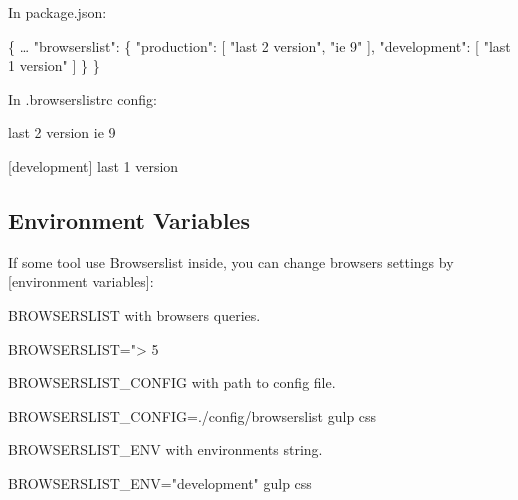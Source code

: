 In {\ttfamily package.\+json}\+:


\begin{DoxyCode}
\{
  …
  "browserslist": \{
    "production": [
      "last 2 version",
      "ie 9"
    ],
    "development": [
      "last 1 version"
    ]
  \}
\}
\end{DoxyCode}


In {\ttfamily .browserslistrc} config\+:


\begin{DoxyCode}
[production]
last 2 version
ie 9

[development]
last 1 version
\end{DoxyCode}


\subsection*{Environment Variables}

If some tool use Browserslist inside, you can change browsers settings by \mbox{[}environment variables\mbox{]}\+:


\begin{DoxyItemize}
\item {\ttfamily B\+R\+O\+W\+S\+E\+R\+S\+L\+I\+ST} with browsers queries.
\end{DoxyItemize}


\begin{DoxyCode}
BROWSERSLIST="> 5%
\end{DoxyCode}



\begin{DoxyItemize}
\item {\ttfamily B\+R\+O\+W\+S\+E\+R\+S\+L\+I\+S\+T\+\_\+\+C\+O\+N\+F\+IG} with path to config file.
\end{DoxyItemize}


\begin{DoxyCode}
BROWSERSLIST\_CONFIG=./config/browserslist gulp css
\end{DoxyCode}



\begin{DoxyItemize}
\item {\ttfamily B\+R\+O\+W\+S\+E\+R\+S\+L\+I\+S\+T\+\_\+\+E\+NV} with environments string.
\end{DoxyItemize}


\begin{DoxyCode}
BROWSERSLIST\_ENV="development" gulp css
\end{DoxyCode}




